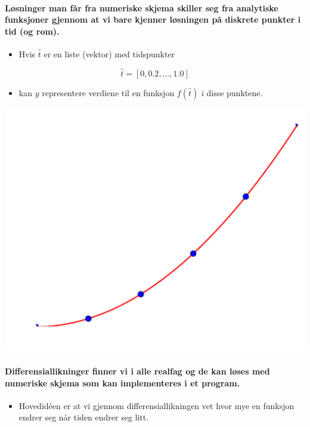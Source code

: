 \documentclass[%
oneside,                 %
final,                   %
10pt]{article}
\begin{document}
\noindent


\paragraph{Løsninger man får fra numeriske skjema skiller seg fra analytiske funksjoner gjennom at vi bare kjenner løsningen på diskrete punkter i tid (og rom).}
\begin{itemize}
\item Hvis $\hat{t}$ er en liste (vektor) med tidspunkter
\end{itemize}

\noindent
\[\hat{t}=[0, 0.2, \ldots, 1.0]\]
\begin{itemize}
\item kan $y$ representere verdiene til en funksjon $f(\hat{t})$ i disse punktene.
\end{itemize}

\noindent



\centerline{\includegraphics[width=0.6\linewidth]{fig/diskret_funksjon.pdf}}




\paragraph{Differensiallikninger finner vi i alle realfag og de kan løses med numeriske skjema som kan implementeres i et program.}
\begin{itemize}
\item Hovedidéen er at vi gjennom differensiallikningen vet hvor mye en funksjon endrer seg når tiden endrer seg litt.
\end{itemize}
\end{document}
